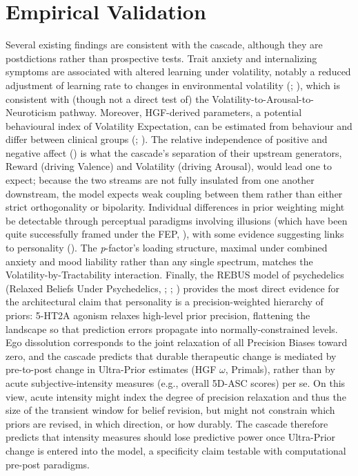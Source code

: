 \documentclass[
  jou,
  floatsintext,
  longtable,
  nolmodern,
  notxfonts,
  notimes,
  12pt,
  colorlinks=true,linkcolor=blue,citecolor=blue,urlcolor=blue]{apa7}
\begin{document}
\section{Empirical Validation}\label{empirical-validation}

Several existing findings are consistent with the cascade, although they
are postdictions rather than prospective tests. Trait anxiety and
internalizing symptoms are associated with altered learning under
volatility, notably a reduced adjustment of learning rate to changes in
environmental volatility (; ), which
is consistent with (though not a direct test of) the
Volatility-to-Arousal-to-Neuroticism pathway. Moreover, HGF-derived
parameters, a potential behavioural index of Volatility Expectation, can
be estimated from behaviour and differ between clinical groups
(;
). The
relative independence of positive and negative affect
() is what the
cascade's separation of their upstream generators, Reward (driving
Valence) and Volatility (driving Arousal), would lead one to expect;
because the two streams are not fully insulated from one another
downstream, the model expects weak coupling between them rather than
either strict orthogonality or bipolarity. Individual differences in
prior weighting might be detectable through perceptual paradigms
involving illusions (which have been quite successfully framed under the
FEP, ), with
some evidence suggesting links to personality
(). The
\emph{p}-factor's loading structure, maximal under combined anxiety and
mood liability rather than any single spectrum, matches the
Volatility-by-Tractability interaction. Finally, the REBUS model of
psychedelics (Relaxed Beliefs Under Psychedelics,
;
;
) provides the most
direct evidence for the architectural claim that personality is a
precision-weighted hierarchy of priors: 5-HT2A agonism relaxes
high-level prior precision, flattening the landscape so that prediction
errors propagate into normally-constrained levels. Ego dissolution
corresponds to the joint relaxation of all Precision Biases toward zero,
and the cascade predicts that durable therapeutic change is mediated by
pre-to-post change in Ultra-Prior estimates (HGF \(\omega\), Primals),
rather than by acute subjective-intensity measures (e.g., overall 5D-ASC
scores) per se. On this view, acute intensity might index the degree of
precision relaxation and thus the size of the transient window for
belief revision, but might not constrain which priors are revised, in
which direction, or how durably. The cascade therefore predicts that
intensity measures should lose predictive power once Ultra-Prior change
is entered into the model, a specificity claim testable with
computational pre-post paradigms.
\end{document}
